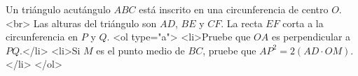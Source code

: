 Un triángulo acutángulo $ABC$ está inscrito en una circunferencia de centro $O$.<br>
Las alturas del triángulo son $AD$, $BE$ y $CF$. La recta $EF$ corta a la circunferencia en $P$ y $Q$.
<ol type="a">
  <li>Pruebe que $OA$ es perpendicular a $PQ$.</li>
  <li>Si $M$ es el punto medio de $BC$, pruebe que $AP^2 = 2(AD \cdot OM)$.</li>
</ol>
